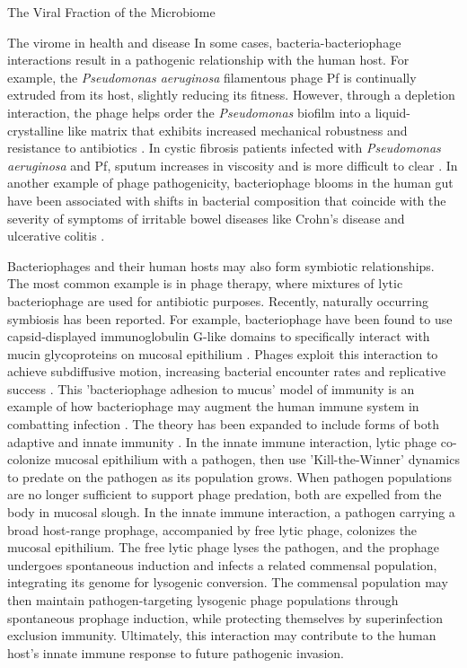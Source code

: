 \documentclass[oneside,12pt,final]{sty/ucthesis-CA2012}
\begin{document}
\begin{mainmatter}
\begin{section}{The Viral Fraction of the Microbiome}
\begin{subsection}{The virome in health and disease}
In some cases, bacteria-bacteriophage interactions result in a pathogenic relationship with the human host. For example, the \textit{Pseudomonas aeruginosa} filamentous phage Pf is continually extruded from its host, slightly reducing its fitness. However, through a depletion interaction, the phage helps order the \textit{Pseudomonas} biofilm into a liquid-crystalline like matrix that exhibits increased mechanical robustness and resistance to antibiotics \cite{RN138, RN77}. In cystic fibrosis patients infected with \textit{Pseudomonas aeruginosa} and Pf, sputum increases in viscosity and is more difficult to clear \cite{RN138, RN139}. In another example of phage pathogenicity, bacteriophage blooms in the human gut have been associated with shifts in bacterial composition that coincide with the severity of symptoms of irritable bowel diseases like Crohn's disease and ulcerative colitis \cite{RN140}. 

Bacteriophages and their human hosts may also form symbiotic relationships. The most common example is in phage therapy, where mixtures of lytic bacteriophage are used for antibiotic purposes. Recently, naturally occurring symbiosis has been reported. For example, bacteriophage have been found to use capsid-displayed immunoglobulin G-like domains to specifically interact with mucin glycoproteins on mucosal epithilium \cite{RN143}. Phages exploit this interaction to achieve subdiffusive motion, increasing bacterial encounter rates and replicative success \cite{RN145}. This 'bacteriophage adhesion to mucus' model of immunity is an example of how bacteriophage may augment the human immune system in combatting infection \cite{RN143}. The theory has been expanded to include forms of both adaptive and innate immunity \cite{RN144}. In the innate immune interaction, lytic phage co-colonize mucosal epithilium with a pathogen, then use 'Kill-the-Winner' dynamics to predate on the pathogen as its population grows. When pathogen populations are no longer sufficient to support phage predation, both are expelled from the body in mucosal slough. In the innate immune interaction, a pathogen carrying a broad host-range prophage, accompanied by free lytic phage, colonizes the mucosal epithilium. The free lytic phage lyses the pathogen, and the prophage undergoes spontaneous induction and infects a related commensal population, integrating its genome for lysogenic conversion. The commensal population may then maintain pathogen-targeting lysogenic phage populations through spontaneous prophage induction, while protecting themselves by superinfection exclusion immunity. Ultimately, this interaction may contribute to the human host's innate immune response to future pathogenic invasion.


\end{subsection}
\end{section}
\end{mainmatter}
\end{document}
